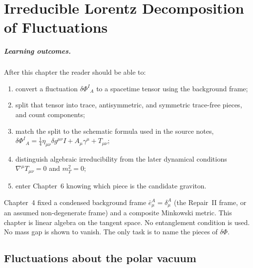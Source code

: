 \chapter[Lorentz decomposition]{Irreducible Lorentz Decomposition of Fluctuations}
\label{ch:lorentz-decomposition}

\paragraph{Learning outcomes.}
After this chapter the reader should be able to:
\begin{enumerate}
  \item convert a fluctuation \(\delta\Phi^I{}_A\) to a spacetime
        tensor using the background frame;
  \item split that tensor into trace, antisymmetric, and symmetric
        trace-free pieces, and count components;
  \item match the split to the schematic formula used in the source
        notes,
        \(\delta\Phi^I{}_A=\tfrac14\eta_{\mu\nu}\delta g^{\mu\nu}I
        +A_\mu\gamma^\mu+T_{\mu\nu}\);
  \item distinguish algebraic irreducibility from the later
        dynamical conditions \(\nabla^\mu T_{\mu\nu}=0\) and
        \(m_T^2=0\);
  \item enter Chapter~6 knowing which piece is the candidate graviton.
\end{enumerate}

Chapter~4 fixed a condensed background frame
\(\bar e^A_\mu=\delta^A_\mu\) (the Repair~II frame, or an assumed
non-degenerate frame) and a composite Minkowski metric.
This chapter is linear algebra on the tangent space. No entanglement
condition is used. No mass gap is shown to vanish. The only task is
to name the pieces of \(\delta\Phi\).

\section{Fluctuations about the polar vacuum}
\label{sec:ch5-fluct}

